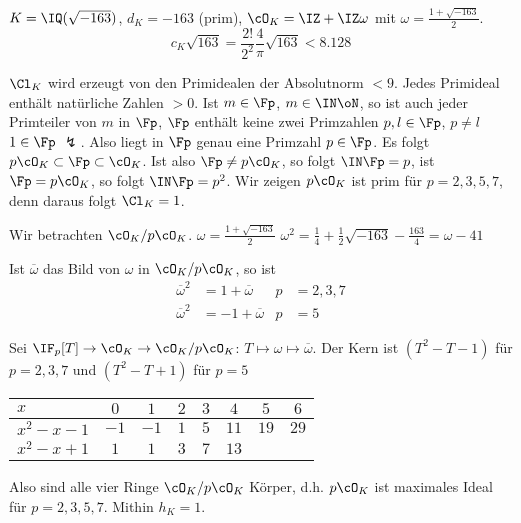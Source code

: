 \begin{Beispiel}
  $K=\IQ(\sqrt{-163})$, $d_K=-163$ (prim), $\cO_K=\IZ+\IZ\omega$ mit $\omega=\frac{1+\sqrt{-163}}{2}$. \[ c_K\sqrt{163}=\frac{2!}{2^2}\frac{4}{\pi} \sqrt{163} < 8.128\]
  
  $\Cl_K$ wird erzeugt von den Primidealen der Absolutnorm $<9$. Jedes Primideal enthält natürliche Zahlen $>0$. 
  Ist $m\in\Fp$, $m\in\IN\oN$, so ist auch jeder Primteiler von $m$ in $\Fp$, $\Fp$ enthält keine zwei Primzahlen $p,l\in\Fp$, $p\neq l$ \folge $1\in\Fp$ $\lightning$. Also liegt in $\Fp$ genau eine Primzahl $p\in\Fp$. Es folgt $p\cO_K\subset\Fp\subset \cO_K$. Ist also $\Fp\neq p\cO_K$, so folgt $\IN\Fp=p$, ist $\Fp=p\cO_K$, so folgt  $\IN\Fp=p^2$. Wir zeigen $p\cO_K$ ist prim für $p=2,3,5,7$, denn daraus folgt $\Cl_K=1$. 
  
  Wir betrachten $\cO_K/p\cO_K$.  $\omega=\frac{1+\sqrt{-163}}{2}$ \folge $\omega^2=\frac{1}{4}+\frac{1}{2}\sqrt{-163}-\frac{163}{4}=\omega-41$ 
  
  Ist $\overline{\omega}$ das Bild von $\omega$ in $\cO_K/p\cO_K$, so ist 
  \begin{align*}
   \overline\omega^2&=1+\overline\omega &p&=2,3,7\\
   \overline\omega^2&=-1+\overline\omega & p&=5
  \end{align*}
  
  Sei $\IF_p[T]\rightarrow \cO_K \rightarrow \cO_K/p\cO_K$: $T\mapsto \omega \mapsto \overline{\omega}$. Der Kern ist $(T^2-T-1)$ für $p=2,3,7$ und $(T^2-T+1)$ für $p=5$
  \begin{center}
  \begin{tabular}{l|ccccccc}
   $x$ & $0$ & $1$ & $2$ & $3$ & $4$& $5$& $6$\\\hline
   $x^2-x-1$ & $-1$ & $-1$ & $1$ & $5$ & $11$ & $19$ & $29$\\\hline
   $x^2-x+1$ & $1$ & $1$ & $3$ & $7$ & $13$ & & 
  \end{tabular}\end{center}

  Also sind alle vier Ringe $\cO_K/p\cO_K$ Körper, d.h. $p\cO_K$ ist maximales Ideal für $p=2,3,5,7$. Mithin $h_K=1$.
 \end{Beispiel}
 
